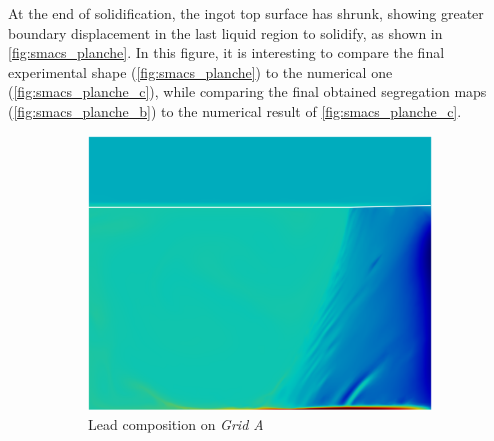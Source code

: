 At the end of solidification, the ingot top surface has shrunk, showing greater boundary displacement in the last liquid region to solidify, as shown
in \cref{fig:smacs_planche}. In this figure, it is interesting to compare the final experimental shape (\cref{fig:smacs_planche}) to the numerical one
(\cref{fig:smacs_planche_c}), while comparing the final obtained segregation maps (\cref{fig:smacs_planche_b}) to the numerical result of \cref{fig:smacs_planche_c}.

\begin{figure}[htbp]
\centering
  \begin{subfigure}[t]{0.4\textwidth}
    \centering
  \includegraphics[width=\textwidth]{Chapter5/Graphics/2d/processed/1200s_compo.png}
  \caption{Lead composition on \emph{Grid A}}
    \label{fig:1200s_compo}
  \end{subfigure}
  \begin{subfigure}[t]{0.15\textwidth}
    \centering

\end{subfigure}
\end{figure}
